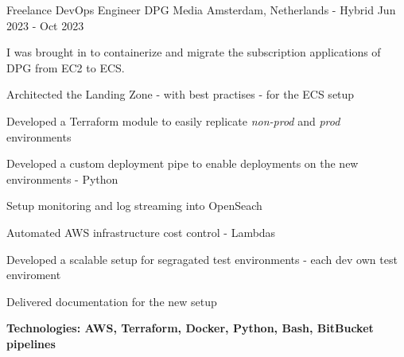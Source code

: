 \begin{cventries}
\cventry
{Freelance DevOps Engineer} %
{DPG Media} %
{Amsterdam, Netherlands - Hybrid} %
{Jun 2023 - Oct 2023} %
{ %
I was brought in to containerize and migrate the subscription applications of DPG from EC2 to ECS.
\newline \hfill
	\begin{cvitems}
		\item {Architected the Landing Zone - with best practises - for the ECS setup}
		\item {Developed a Terraform module to easily replicate \emph{non-prod} and \emph{prod} environments}
		\item {Developed a custom deployment pipe to enable deployments on the new environments - Python}
		\item {Setup monitoring and log streaming into OpenSeach}
		\item {Automated AWS infrastructure cost control - Lambdas}
		\item {Developed a scalable setup for segragated test environments - each dev own test enviroment}
		\item {Delivered documentation for the new setup}
		\item {\bfseries{Technologies:} AWS, Terraform, Docker, Python, Bash, BitBucket pipelines}
	\end{cvitems}
}


\end{cventries}

